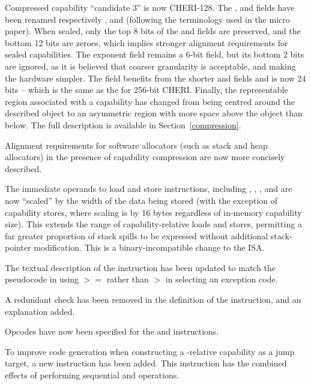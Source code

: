 \begin{description}
  Compressed capability ``candidate 3'' is now CHERI-128. The \cbasebits{},
  \ctopbits{} and
  \ccursor{} fields have been renamed respectively \cB{}, \cT{} and \caddr{}
  (following the terminology used in the micro paper). When sealed, only the
  top 8 bits of the \cB{} and \cT{} fields are preserved, and the bottom 12
  bits are zeroes, which implies stronger alignment requirements for sealed
  capabilities. The exponent \cexponent{} field remains a 6-bit field, but its
  bottom 2 bits are ignored, as it is believed that coarser granularity is
  acceptable, and making the hardware simpler. The \cotype{} field benefits
  from the shorter \cB{} and \cT{} fields and is now 24 bits -- which is the same
  as the \cotype{} for 256-bit CHERI. Finally, the representable region
  associated with a capability has changed from being centred around the
  described object to an asymmetric region with more space above the object
  than below. The full description is available in Section~\ref{compression}.

  Alignment requirements for software allocators (such as stack and heap
  allocators) in the presence of capability compression are now more
  concisely described.

  The immediate operands to load and store instructions, including
  , , , and
   are now ``scaled'' by the width of the data being
  stored (with the exception of capability stores, where scaling is by 16
  bytes regardless of in-memory capability size).
  This extends the range of capability-relative loads and stores, permitting
  a far greater proportion of stack spills to be expressed without additional
  stack-pointer modification.
  This is a binary-incompatible change to the ISA.

  The textual description of the  instruction has been
  updated to match the pseudocode in using $>=$ rather than $>$ in selecting
  an exception code.

  A redundant check has been removed in the definition of the
   instruction, and an explanation added.

  Opcodes have now been specified for the  and
   instructions.

  To improve code generation when constructing a \PCC{}-relative capability as
  a jump target, a new  instruction has been
  added.
  This instruction has the combined effects of performing sequential
   and  operations.


\end{description}
